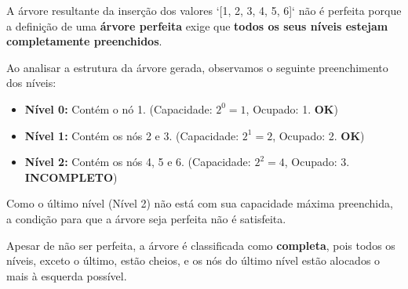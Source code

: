 \documentclass[12pt, a4paper]{article}
\begin{document}
A árvore resultante da inserção dos valores `[1, 2, 3, 4, 5, 6]` não é perfeita porque a definição de uma \textbf{árvore perfeita} exige que \textbf{todos os seus níveis estejam completamente preenchidos}.

Ao analisar a estrutura da árvore gerada, observamos o seguinte preenchimento dos níveis:
\begin{itemize}
    \item \textbf{Nível 0:} Contém o nó 1. (Capacidade: $2^0=1$, Ocupado: 1. \textbf{OK})
    \item \textbf{Nível 1:} Contém os nós 2 e 3. (Capacidade: $2^1=2$, Ocupado: 2. \textbf{OK})
    \item \textbf{Nível 2:} Contém os nós 4, 5 e 6. (Capacidade: $2^2=4$, Ocupado: 3. \textbf{INCOMPLETO})
\end{itemize}

Como o último nível (Nível 2) não está com sua capacidade máxima preenchida, a condição para que a árvore seja perfeita não é satisfeita.

Apesar de não ser perfeita, a árvore é classificada como \textbf{completa}, pois todos os níveis, exceto o último, estão cheios, e os nós do último nível estão alocados o mais à esquerda possível.
\end{document}
